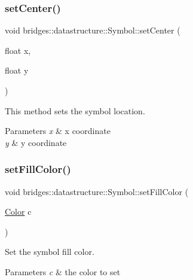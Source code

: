 \subsubsection{\texorpdfstring{set\+Center()}{setCenter()}}
{\footnotesize\ttfamily void bridges\+::datastructure\+::\+Symbol\+::set\+Center (\begin{DoxyParamCaption}\item[{float}]{x,  }\item[{float}]{y }\end{DoxyParamCaption})\hspace{0.3cm}{\ttfamily [inline]}}



This method sets the symbol location. 


\begin{DoxyParams}{Parameters}
{\em x} & x coordinate \\
\hline
{\em y} & y coordinate \\
\hline
\end{DoxyParams}
\mbox{\label{classbridges_1_1datastructure_1_1_symbol_a3019a17458fe5f0381cfd611338af6f7}} 
\subsubsection{\texorpdfstring{set\+Fill\+Color()}{setFillColor()}\hspace{0.1cm}{\footnotesize\ttfamily [1/2]}}
{\footnotesize\ttfamily void bridges\+::datastructure\+::\+Symbol\+::set\+Fill\+Color (\begin{DoxyParamCaption}\item[{\hyperlink{classbridges_1_1datastructure_1_1_color}{Color}}]{c }\end{DoxyParamCaption})\hspace{0.3cm}{\ttfamily [inline]}}



Set the symbol fill color. 


\begin{DoxyParams}{Parameters}
{\em c} & the color to set \\
\hline
\end{DoxyParams}
\mbox{\label{classbridges_1_1datastructure_1_1_symbol_ad7b92720fe76b59f1922fe25c967f442}} 
